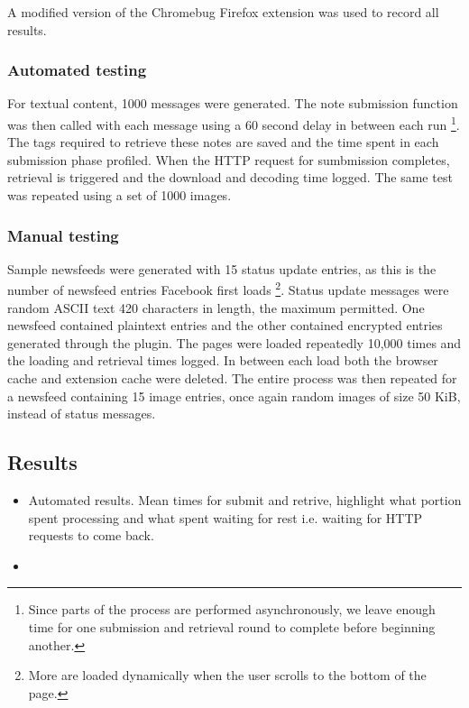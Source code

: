 A modified version of the Chromebug Firefox extension was used to record all results.

\subsubsection{Automated testing}

For textual content, 1000 messages were generated. The note submission function was then called with each message using a 60 second delay in between each run \footnote{Since parts of the process are performed asynchronously, we leave enough time for one submission and retrieval round to complete before beginning another.}. The tags required to retrieve these notes are saved and the time spent in each submission phase profiled. When the HTTP request for sumbmission completes, retrieval is triggered and the download and decoding time logged. The same test was repeated using a set of 1000 images.

\subsubsection{Manual testing}

Sample newsfeeds were generated with 15 status update entries, as this is the number of newsfeed entries Facebook first loads \footnote{More are loaded dynamically when the user scrolls to the bottom of the page.}. Status update messages were random ASCII text 420 characters in length, the maximum permitted. One newsfeed contained plaintext entries and the other contained encrypted entries generated through the plugin. The pages were loaded repeatedly 10,000 times and the loading and retrieval times logged. In between each load both the browser cache and extension cache were deleted. The entire process was then repeated for a newsfeed containing 15 image entries, once again random images of size 50 KiB, instead of status messages.

\subsection{Results}

\begin{itemize}
    \item Automated results. Mean times for submit and retrive, highlight what portion spent processing and what spent waiting for rest i.e. waiting for HTTP requests to come back.
    \item 
\end{itemize}